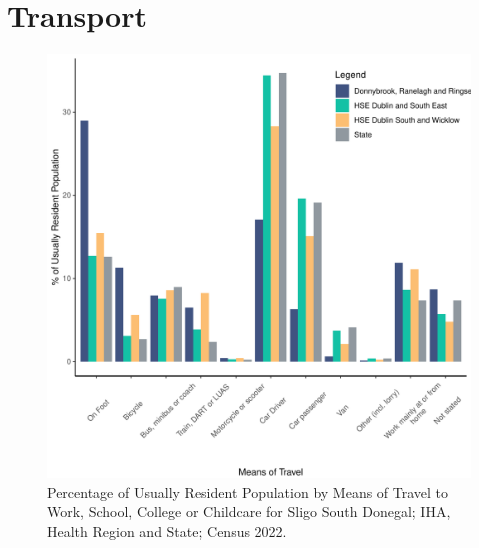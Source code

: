 \documentclass{article}
\begin{document}
\section{Transport}\label{sect:Trans}
\begin{figure}[H]
	\centering
	\includegraphics[width = 120mm]{../figures/TravelED.pdf}
	\caption{Percentage of Usually Resident Population by Means of Travel to Work, School, College or Childcare for Sligo South Donegal; IHA, Health Region and State; Census 2022.}
	\label{fig:vbnv}
	\end{figure}
\end{document}
